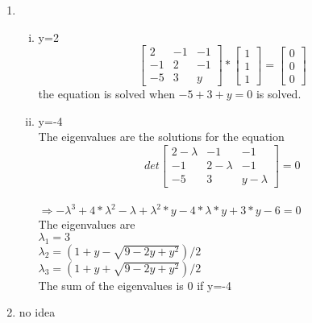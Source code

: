 \documentclass[12pt]{article}
\begin{document}
\begin{enumerate}[1)]
    \item
        \begin{enumerate}[(i)]
            \item 
                y=2\\$$\begin{bmatrix}2&-1&-1\\-1&2&-1\\-5&3&y\end{bmatrix}*\begin{bmatrix}1\\1\\1\end{bmatrix}=\begin{bmatrix}0\\0\\0\end{bmatrix}$$
                the equation is solved when $-5+3+y=0$ is solved.
            \item
                y=-4\\
                The eigenvalues are the solutions for the equation $$det\begin{bmatrix}2-\lambda&-1&-1\\-1&2-\lambda&-1\\-5&3&y-\lambda\end{bmatrix}=0$$\\$\Rightarrow-\lambda^3+4*\lambda^2-\lambda+\lambda^2*y-4*\lambda*y+3*y-6=0$\\
                The eigenvalues are \\
                $\lambda_{1} = 3$\\
                $\lambda_{2} = (1+y-\sqrt{9-2y+y^2})/2$\\
                $\lambda_{3} = (1+y+\sqrt{9-2y+y^2})/2$\\
                The sum of the eigenvalues is 0 if y=-4\\
        \end{enumerate}
    \item
        no idea
\end{enumerate}

\newpage
\end{document}
